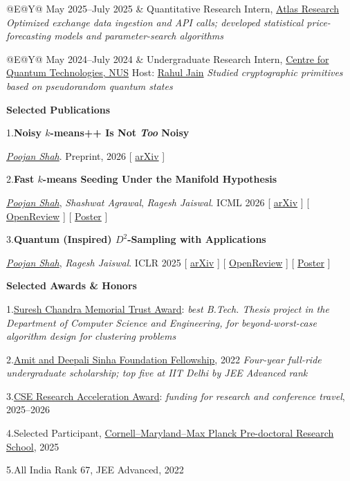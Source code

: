 \documentclass[11pt,letterpaper]{article}
\makeatletter
\newcommand{\cvsection}[1]{%
  \par\needspace{2.5\baselineskip}%
  \vspace{0.45\baselineskip}%
  {\large\bfseries\color{HeadingBlack} #1}\par
  \vspace{0.20\baselineskip}%
}
\newcommand{\experience}[2]{%
  \begin{tabularx}{\textwidth}{@{}E@{\hspace{0.12in}}Y@{}}
    \textcolor{DateSlate}{#1} & #2
  \end{tabularx}\par\vspace{0.16\baselineskip}%
}
\newcommand{\numberedaward}[2]{%
  \par\needspace{2\baselineskip}%
  #1.\enspace #2%
  \par\vspace{-0.14\baselineskip}%
}
\newcommand{\resourcelink}[3]{%
  \textcolor{BracketGray}{[}%
  \href{#2}{\textcolor{#1}{#3}}%
  \textcolor{BracketGray}{]}%
}
\newcommand{\selfauthor}[1]{\textit{\ul{#1}}}
\newcommand{\publicationblock}[5]{%
  \par\needspace{3\baselineskip}%
  #1.\enspace\textbf{#2}\par
  \vspace{0.06\baselineskip}%
  #3. #4\quad #5\par
  \vspace{0.18\baselineskip}%
}
\makeatother
\begin{document}
\experience{May 2025--July 2025}{%
  Quantitative Research Intern, \href{https://www.atlasresearch.ai/}{Atlas Research} \newline
  \emph{Optimized exchange data ingestion and API calls; developed statistical\newline
  price-forecasting models and parameter-search algorithms}
}

\experience{May 2024--July 2024}{%
  Undergraduate Research Intern, \href{https://cs.quantumlah.org/}{Centre for Quantum Technologies, NUS}\newline
  Host: \href{https://www.comp.nus.edu.sg/~rahul/}{Rahul Jain}\newline
  \emph{Studied cryptographic primitives based on pseudorandom quantum states}
}


\cvsection{Selected Publications}

\publicationblock{1}
  {Noisy \(k\)-means++ Is Not \emph{Too} Noisy}
  {\selfauthor{Poojan Shah}}
  {Preprint, 2026}
  {\resourcelink{ArxivBlack}{https://arxiv.org/abs/2608.02318}{arXiv}}

\publicationblock{2}
  {Fast \(k\)-means Seeding Under the Manifold Hypothesis}
  {\selfauthor{Poojan Shah}, \textit{Shashwat Agrawal}, \textit{Ragesh Jaiswal}}
  {ICML 2026}
  {%
    \resourcelink{ArxivBlack}{https://arxiv.org/abs/2602.01104}{arXiv}\enspace
    \resourcelink{OpenReviewRed}{https://openreview.net/forum?id=lgsMOTIAYu}{OpenReview}\enspace
    \resourcelink{PosterGreen}{https://icml.cc/virtual/2026/poster/61918}{Poster}%
  }

\publicationblock{3}
  {Quantum (Inspired) \(D^2\)-Sampling with Applications}
  {\selfauthor{Poojan Shah}, \textit{Ragesh Jaiswal}}
  {ICLR 2025}
  {%
    \resourcelink{ArxivBlack}{https://arxiv.org/abs/2405.13351}{arXiv}\enspace
    \resourcelink{OpenReviewRed}{https://openreview.net/forum?id=tDIL7UXmSS}{OpenReview}\enspace
    \resourcelink{PosterGreen}{https://iclr.cc/virtual/2025/poster/28068}{Poster}%
  }

\cvsection{Selected Awards \& Honors}

\numberedaward{1}{\href{https://convocation.iitd.ac.in/api/uploadsNews/1786106054960-Convocation\%20Brochure\%202026\%20\%28English\%29.pdf}{Suresh Chandra Memorial Trust Award}: \emph{best B.Tech. Thesis project in the Department of Computer Science and Engineering, for beyond-worst-case algorithm design for clustering problems}}
\numberedaward{2}{\href{https://alumni.iitd.ac.in/scholarships-awards/722}{Amit and Deepali Sinha Foundation Fellowship}, \textcolor{DateSlate}{2022}\newline
  \emph{Four-year full-ride undergraduate scholarship; top five at IIT Delhi by JEE Advanced rank}}
\numberedaward{3}{\href{https://csealumni.iitd.ac.in/cse-raf-travel-grants/}{CSE Research Acceleration Award}: \emph{funding for research and conference travel}, \textcolor{DateSlate}{2025--2026}}
\numberedaward{4}{Selected Participant, \href{https://cmmrs.mpi-sws.org/}{Cornell--Maryland--Max Planck Pre-doctoral Research School}, \textcolor{DateSlate}{2025}}
\numberedaward{5}{All India Rank 67, JEE Advanced, \textcolor{DateSlate}{2022}}
\end{document}
